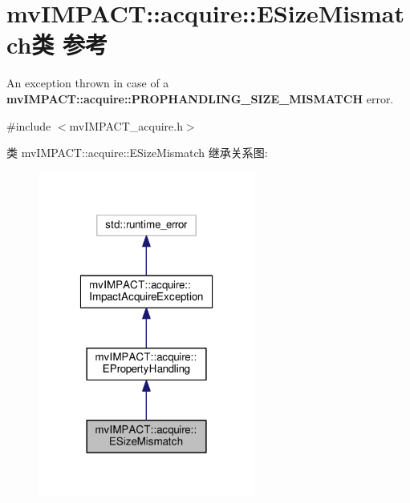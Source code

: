 \hypertarget{classmv_i_m_p_a_c_t_1_1acquire_1_1_e_size_mismatch}{\section{mv\+I\+M\+P\+A\+C\+T\+:\+:acquire\+:\+:E\+Size\+Mismatch类 参考}
\label{classmv_i_m_p_a_c_t_1_1acquire_1_1_e_size_mismatch}
}


An exception thrown in case of a {\bfseries mv\+I\+M\+P\+A\+C\+T\+::acquire\+::\+P\+R\+O\+P\+H\+A\+N\+D\+L\+I\+N\+G\+\_\+\+S\+I\+Z\+E\+\_\+\+M\+I\+S\+M\+A\+T\+C\+H} error.  




{\ttfamily \#include $<$mv\+I\+M\+P\+A\+C\+T\+\_\+acquire.\+h$>$}



类 mv\+I\+M\+P\+A\+C\+T\+:\+:acquire\+:\+:E\+Size\+Mismatch 继承关系图\+:
\nopagebreak
\begin{figure}[H]
\begin{center}
\leavevmode
\includegraphics[width=202pt]{classmv_i_m_p_a_c_t_1_1acquire_1_1_e_size_mismatch__inherit__graph}
\end{center}
\end{figure}


